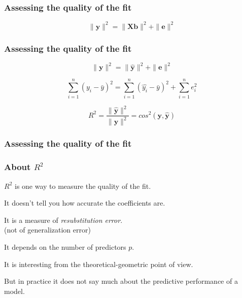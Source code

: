 \documentclass[12pt]{beamer}\usepackage[]{graphicx}\usepackage[]{color}
\begin{document}

\begin{frame}
\frametitle{Assessing the quality of the fit}
\begin{center}
\end{center}

$$
\| \mathbf{y} \|^2 = \| \mathbf{Xb} \|^2 + \| \mathbf{e} \|^2
$$

\end{frame}


\begin{frame}[fragile]
\frametitle{Assessing the quality of the fit}

$$
\| \mathbf{y} \|^2 = \| \mathbf{\hat{y}} \|^2 + \| \mathbf{e} \|^2
$$

$$
\sum_{i=1}^{n} (y_i - \bar{y})^2 = \sum_{i=1}^{n} (\hat{y_i} - \bar{y})^2 + \sum_{i=1}^{n} e_i^2
$$

$$
R^2 = \frac{\| \mathbf{\hat{y}} \|^2}{\| \mathbf{y} \|^2} = cos^2 (\mathbf{y}, \mathbf{\hat{y}})
$$

\end{frame}


\begin{frame}
\frametitle{Assessing the quality of the fit}
\begin{center}
\end{center}
\end{frame}


\begin{frame}
\frametitle{About $R^2$}

\bbi
  \item $R^2$ is one way to measure the quality of the fit.
  \item It doesn't tell you how accurate the coefficients are.
  \item It is a measure of \textit{resubstitution error}. \\
  (not of generalization error)
  \item It depends on the number of predictors $p$.
  \item It is interesting from the theoretical-geometric point of view.
  \item But in practice it does not say much about the predictive
  performance of a model.
\ei

\end{frame}
\end{document}
